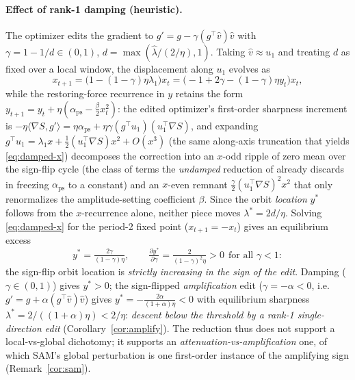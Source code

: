 \paragraph{Effect of rank-1 damping (heuristic).}
The optimizer edits the gradient to $g'=g-\gamma(g^{\top}\hat v)\hat v$ with
$\gamma=1-1/d\in(0,1)$, $d=\max(\hat\lambda/(2/\eta),1)$. Taking $\hat v\approx u_{1}$ and treating $d$ as
fixed over a local window, the displacement along $u_{1}$ evolves as
\begin{equation}
x_{t+1}=\bigl(1-(1-\gamma)\eta\lambda_{1}\bigr)x_{t}
       =\bigl(-1+2\gamma-(1-\gamma)\eta y_{t}\bigr)x_{t},
\label{eq:damped-x}
\end{equation}
while the restoring-force recurrence in $y$ retains the form
$y_{t+1}=y_{t}+\eta(\alpha_{\mathrm{ps}}-\tfrac{\beta}{2}x_{t}^{2})$: the edited
optimizer's first-order sharpness increment is
$-\eta\langle\nabla S,g'\rangle=\eta\alpha_{\mathrm{ps}}+\eta\gamma(g^{\top}u_{1})(u_{1}^{\top}\nabla S)$,
and expanding $g^{\top}u_{1}=\lambda_{1}x+\tfrac12(u_{1}^{\top}\nabla S)x^{2}+O(x^{3})$
(the same along-axis truncation that yields \eqref{eq:damped-x}) decomposes the
correction into an $x$-odd ripple of zero mean over the sign-flip cycle (the
class of terms the \emph{undamped} reduction of \citet{damian2023selfstab}
already discards in freezing $\alpha_{\mathrm{ps}}$ to a constant) and an
$x$-even remnant $\tfrac{\gamma}{2}(u_{1}^{\top}\nabla S)^{2}x^{2}$ that only
renormalizes the amplitude-setting coefficient $\beta$. Since the orbit
\emph{location} $y^{*}$ follows from the $x$-recurrence alone, neither piece
moves $\lambda^{*}=2d/\eta$. Solving
\eqref{eq:damped-x} for the period-2 fixed point ($x_{t+1}=-x_{t}$) gives an
equilibrium excess
\begin{equation}
y^{*}=\tfrac{2\gamma}{(1-\gamma)\eta},
\qquad\tfrac{\partial y^{*}}{\partial\gamma}=\tfrac{2}{(1-\gamma)^{2}\eta}>0
\ \ \text{for all }\gamma<1:
\label{eq:ystar}
\end{equation}
 the sign-flip orbit location is \emph{strictly increasing in the sign of the edit}.
Damping ($\gamma\in(0,1)$) gives $y^{*}>0$; the sign-flipped
\emph{amplification} edit ($\gamma=-\alpha<0$, i.e.\
$g'=g+\alpha(g^{\top}\hat v)\hat v$) gives
$y^{*}=-\tfrac{2\alpha}{(1+\alpha)\eta}<0$ with equilibrium sharpness
$\lambda^{*}=2/((1+\alpha)\eta)<2/\eta$: \emph{descent below the threshold by a rank-1
single-direction edit} (Corollary~\ref{cor:amplify}). The reduction thus
does not support a local-vs-global dichotomy; it supports an
\emph{attenuation-vs-amplification} one, of which SAM's global perturbation
is one first-order instance of the amplifying sign
(Remark~\ref{cor:sam}).


